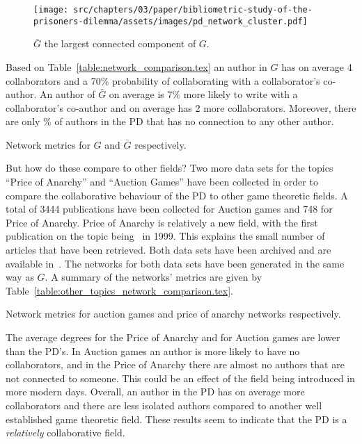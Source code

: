 \begin{figure}[!hbtp]
    \texttt{[image: src/chapters/03/paper/bibliometric-study-of-the-prisoners-dilemma/assets/images/pd\_network\_cluster.pdf]}
    \caption{\(\bar{G}\) the largest connected component of \(G\).}\label{fig:graphical_representation_g_bar}
\end{figure}

Based on Table~\ref{table:network_comparison.tex} an author in \(G\) has on
average 4 collaborators and a 70\% probability of collaborating with a
collaborator's co-author. An author of \(\bar{G}\) on average is 7\% more likely
to write with a collaborator's co-author and on average has 2 more
collaborators. Moreover, there are only \isolatedpercentage\% of authors in the
PD that has no connection to any other author.

\begin{table}[!hbtp]
    \centering
    \resizebox{\textwidth}{!}{
    }
    \caption{Network metrics for \(G\) and \(\bar{G}\) respectively.}
    \label{table:network_comparison.tex}
\end{table}

But how do these compare to other fields? Two more data sets for the topics
``Price of Anarchy'' and ``Auction Games'' have been collected in order to
compare the collaborative behaviour of the PD to other game theoretic fields. A
total of 3444 publications have been collected for Auction games and 748 for
Price of Anarchy. Price of Anarchy is relatively a new field, with the first
publication on the topic being~\cite{Koutsoupias1999} in 1999. This explains the
small number of articles that have been retrieved. Both data sets have been
archived and are available in~\cite{auction_data_2018, anarchy_data_2018}.
The networks for both data sets have been generated in the same way as \(G\).
A summary of the networks' metrics are given by Table~\ref{table:other_topics_network_comparison.tex}.

\begin{table}[!hbtp]
    \centering
    \resizebox{\textwidth}{!}{
    }
    \caption{Network metrics for auction games and price of anarchy networks respectively.}
    \label{table:other_topics_network_comparison.tex}
\end{table}

The average degrees for the Price of Anarchy and for Auction games are lower
than the PD's. In Auction games an author is more likely to have no collaborators,
and in the Price of Anarchy there are almost no authors that are not connected
to someone. This could be an effect of the field being introduced in more modern
days. Overall, an author in the PD has on average more collaborators
and there are less isolated authors compared to another well established game
theoretic field. These results seem to indicate that the PD is a \textit{relatively} collaborative
field.

